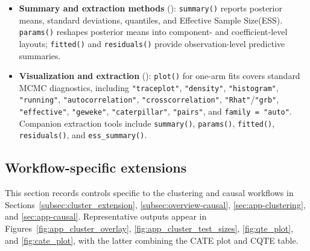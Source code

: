 \documentclass[article]{jss}\usepackage[]{graphicx}\usepackage[]{xcolor}
\DeclareRobustCommand{\code}[1]{\nolinkurl{#1}}
\begin{document}
\begin{itemize}
\item \textbf{Summary and extraction methods} (\label{subsec:app-intervals}): \code{summary()} reports posterior means, standard deviations, quantiles, and Effective Sample Size(ESS). \code{params()} reshapes posterior means into component- and coefficient-level layouts; \code{fitted()} and \code{residuals()} provide observation-level predictive summaries.
\item \textbf{Visualization and extraction} (\label{subsec:app-plots}\label{subsec:app-summaries}): \code{plot()} for one-arm fits covers standard MCMC diagnostics, including \code{"traceplot"}, \code{"density"}, \code{"histogram"}, \code{"running"}, \code{"autocorrelation"}, \code{"crosscorrelation"}, \code{"Rhat"}/\code{"grb"}, \code{"effective"}, \code{"geweke"}, \code{"caterpillar"}, \code{"pairs"}, and \code{family = "auto"}. Companion extraction tools include \code{summary()}, \code{params()}, \code{fitted()}, \code{residuals()}, and \code{ess\_summary()}.

\end{itemize}

\subsection{Workflow-specific extensions}
\label{subsec:app-workflows}

This section records controls specific to the clustering and causal workflows in Sections~\ref{subsec:cluster_extension}, \ref{subsec:overview-causal}, \ref{sec:app-clustering}, and \ref{sec:app-causal}. Representative outputs appear in Figures~\ref{fig:app_cluster_overlay}, \ref{fig:app_cluster_test_sizes}, \ref{fig:qte_plot}, and \ref{fig:cate_plot}, with the latter combining the CATE plot and CQTE table.
\end{document}
